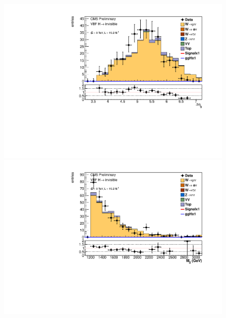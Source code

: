 \begin{figure}
  \includegraphics[width=.6\largefigwidth]{plots/parked/AN-14-243-figs/output_sigreg/munu_dijet_deta.pdf}
  \includegraphics[width=.6\largefigwidth]{plots/parked/AN-14-243-figs/output_sigreg/munu_dijet_M.pdf}


\end{figure}
